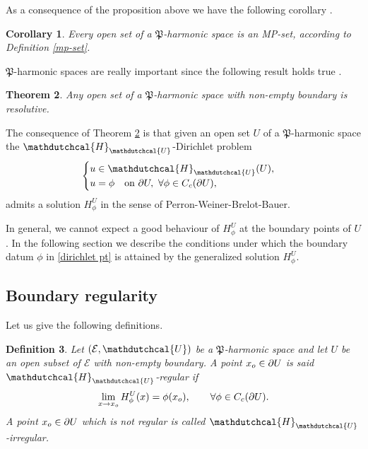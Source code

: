 \documentclass{amsart}
\newtheorem{thm}{Theorem}[section]
\newtheorem{corol}[thm]{Corollary}
\newtheorem{defn}[thm]{Definition}
\numberwithin{equation}{section}
\def \p{{\phi}}
\def \Hd{{\mathdutchcal{H}}}
\def \Ec{{\mathcal{E}}}
\def \Ud{{\mathdutchcal{U}}}
\begin{document}
{As a consequence of the proposition above we have the following corollary \cite[Corollary 2.3.3]{CC72}.
\begin{corol}\label{open set is mp-set}
Every open set of a $\mathfrak{P}$-harmonic space is an MP-set, according to Definition \textup{\ref{mp-set}}.
\end{corol}
$\mathfrak{P}$-harmonic spaces are really important since the following result holds true \cite[Theorem 2.4.2]{CC72}.
\begin{thm}
\label{thm 2}
Any open set of a $\mathfrak{P}$-harmonic space with non-empty boundary is resolutive.
\end{thm}
The consequence of Theorem \ref{thm 2} is that given an open set $U$ of a $\mathfrak{P}$-harmonic space the $\Hd_{\Ud}$-Dirichlet problem
\begin{equation}\label{dirichlet pt}
\begin{cases}
u \in \Hd_{\Ud}(U),\\
u=\p \quad \text{on}\ \partial U,\ \forall \p \in {C}_c(\partial U),
\end{cases}
\end{equation}
admits a solution $H^U_\p$ in the sense of {{Perron-Weiner-Brelot-Bauer}}.
\vspace{2mm}

In general, we cannot expect a good behaviour of $H^U_\p$ at the boundary points of $U$. In the following section we describe the conditions under which the boundary datum $\p$ in \eqref{dirichlet pt} is attained by the generalized solution $H^U_\p$.

\subsection{Boundary regularity}
Let us give the following definitions.
\begin{defn}
	 Let $(\Ec,\Ud)$ be a $\mathfrak{P}$-harmonic space and let $U$ be an open subset of $\Ec$ with non-empty boundary. A point $x_{\rm o} \in \partial U$ is said \textup{$\Hd_{\Ud}$-regular} if 
	$$
	\lim_{x \rightarrow x_{\rm o}}H^U_\p (x)= \p(x_{\rm o}), \qquad \forall \p \in {C}_c(\partial U).
	$$
	A point $x_{\rm o} \in \partial U$ which is not regular is called $\Hd_{\Ud}$-irregular.
\end{defn}

}
\end{document}
